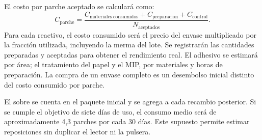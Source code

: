 El costo por parche aceptado se calculará como:
\[
C_{\mathrm{parche}}=
\frac{C_{\mathrm{materiales\ consumidos}}+C_{\mathrm{preparacion}}+
C_{\mathrm{control}}}{N_{\mathrm{aceptados}}}.
\]
Para cada reactivo, el costo consumido será el precio del envase multiplicado por la fracción utilizada, incluyendo la merma del lote. Se registrarán las cantidades preparadas y aceptadas para obtener el rendimiento real. El adhesivo se estimará por área; el tratamiento del papel y el MIP, por materiales y horas de preparación. La compra de un envase completo es un desembolso inicial distinto del costo consumido por parche.

El sobre se cuenta en el paquete inicial y se agrega a cada recambio posterior. Si se cumple el objetivo de siete días de uso, el consumo medio será de aproximadamente 4,3 parches por cada 30 días. Este supuesto permite estimar reposiciones sin duplicar el lector ni la pulsera.

